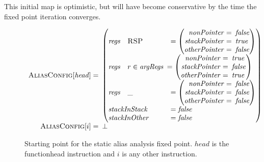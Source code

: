 This initial map is optimistic, but will have become conservative by
the time the fixed point iteration converges.

\begin{figure}
  \begin{displaymath}
    \begin{array}{rl}
      \textsc{AliasConfig}[\mathit{head}] = &\!\!\!\left(\!\!\!\begin{array}{lll}
        \mathit{regs} & \textsc{RSP} & = \left(\begin{array}{rl}
          \mathit{nonPointer} = &\!\!\!\mathit{false}\!\!\!\\
          \!\!\!\mathit{stackPointer} = &\!\!\!\mathit{true}\!\!\!\\
          \!\!\!\mathit{otherPointer} = &\!\!\!\mathit{false}\!\!\!
        \end{array}\right)\\
        \mathit{regs} & r \in \mathit{argRegs} &\!\!\!= \left(\begin{array}{rl}
          \mathit{nonPointer} = &\!\!\!\mathit{true}\!\!\!\\
          \!\!\!\mathit{stackPointer} = &\!\!\!\mathit{false}\!\!\!\\
          \!\!\!\mathit{otherPointer} = &\!\!\!\mathit{true}\!\!\!
        \end{array}\right)\\
        \mathit{regs} & \_ & = \left(\begin{array}{rl}
          \mathit{nonPointer} = &\!\!\!\mathit{false}\!\!\!\\
          \!\!\!\mathit{stackPointer} = &\!\!\!\mathit{false}\!\!\!\\
          \!\!\!\mathit{otherPointer} = &\!\!\!\mathit{false}\!\!\!
        \end{array}\right)\\
        \multicolumn{2}{l}{\mathit{stackInStack}} & = \mathit{false}\\
        \multicolumn{2}{l}{\mathit{stackInOther}} & = \mathit{false}\\
      \end{array}\!\!\!\right)\\
      \textsc{AliasConfig}[i] = &\!\!\!\bot\\
    \end{array}
  \end{displaymath}
  \caption{Starting point for the static alias analysis fixed point.
    $\mathit{head}$ is the \gls{functionhead} instruction and $i$ is
    any other instruction.}
  \label{fig:static_alias:initial_config}
\end{figure}


